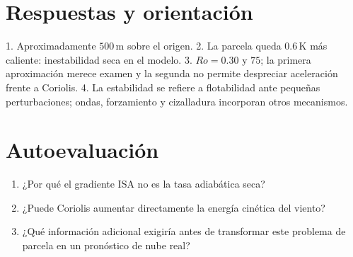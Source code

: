 \section{Respuestas y orientación}
1. Aproximadamente $500\,\mathrm{m}$ sobre el origen. 2. La parcela queda $0.6\,\mathrm{K}$ más caliente: inestabilidad seca en el modelo. 3. $Ro=0.30$ y $75$; la primera aproximación merece examen y la segunda no permite despreciar aceleración frente a Coriolis. 4. La estabilidad se refiere a flotabilidad ante pequeñas perturbaciones; ondas, forzamiento y cizalladura incorporan otros mecanismos.

\section{Autoevaluación}
\begin{enumerate}
\item ¿Por qué el gradiente ISA no es la tasa adiabática seca?
\item ¿Puede Coriolis aumentar directamente la energía cinética del viento?
\item ¿Qué información adicional exigiría antes de transformar este problema de parcela en un pronóstico de nube real?
\end{enumerate}


\studiumchaptercheck
